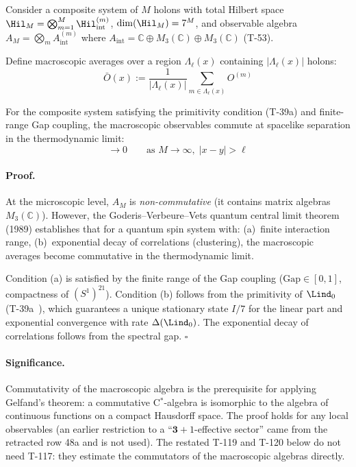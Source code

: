 Consider a composite system of $M$ holons with total Hilbert space
$\Hil_M = \bigotimes_{m=1}^M \Hil_{\mathrm{int}}^{(m)}$, $\dim(\Hil_M) = 7^M$, and
observable algebra $A_M = \bigotimes_m A_{\mathrm{int}}^{(m)}$ where
$A_{\mathrm{int}} = \mathbb{C} \oplus M_3(\mathbb{C}) \oplus M_3(\mathbb{C})$
(T-53).

Define macroscopic averages over a region $\Lambda_\ell(x)$ containing
$|\Lambda_\ell(x)|$ holons:
\begin{equation}
  \bar{O}(x) := \frac{1}{|\Lambda_\ell(x)|} \sum_{m \in \Lambda_\ell(x)} O^{(m)}
  \label{eq:macro-average}
\end{equation}

\begin{theorembox}
For the composite system satisfying the primitivity condition (T-39a) and finite-range
Gap coupling, the macroscopic observables commute at spacelike separation in the
thermodynamic limit:
\begin{equation}
  [\bar{O}_1(x),\, \bar{O}_2(y)] \to 0
  \qquad\text{as } M \to \infty,\; |x-y| > \ell
  \label{eq:commutativity}
\end{equation}
\end{theorembox}

\paragraph{Proof.}
At the microscopic level, $A_M$ is \emph{non-commutative} (it contains matrix algebras
$M_3(\mathbb{C})$). However, the Goderis--Verbeure--Vets quantum central limit theorem~\cite{goderis1989}
(1989) establishes that for a quantum spin system with: (a)~finite interaction range,
(b)~exponential decay of correlations (clustering), the macroscopic averages become
commutative in the thermodynamic limit.

Condition (a) is satisfied by the finite range of the Gap coupling
($\mathrm{Gap} \in [0,1]$, compactness of $(S^1)^{21}$). Condition (b) follows from the
primitivity of $\Lind_0$ (T-39a~), which guarantees a unique stationary state
$I/7$ for the linear part and exponential convergence with rate $\Delta(\Lind_0)$. The
exponential decay of correlations follows from the spectral gap. $\square$

\paragraph{Significance.}
Commutativity of the macroscopic algebra is the prerequisite for applying Gelfand's theorem:
a commutative C$^*$-algebra is isomorphic to the algebra of continuous functions on a
compact Hausdorff space. The proof holds for any local observables (an earlier restriction
to a ``$\mathbf{3}+1$-effective sector'' came from the retracted row 48a and is not used).
The restated T-119 and T-120 below do not need T-117: they estimate the commutators of the
macroscopic algebras directly.

